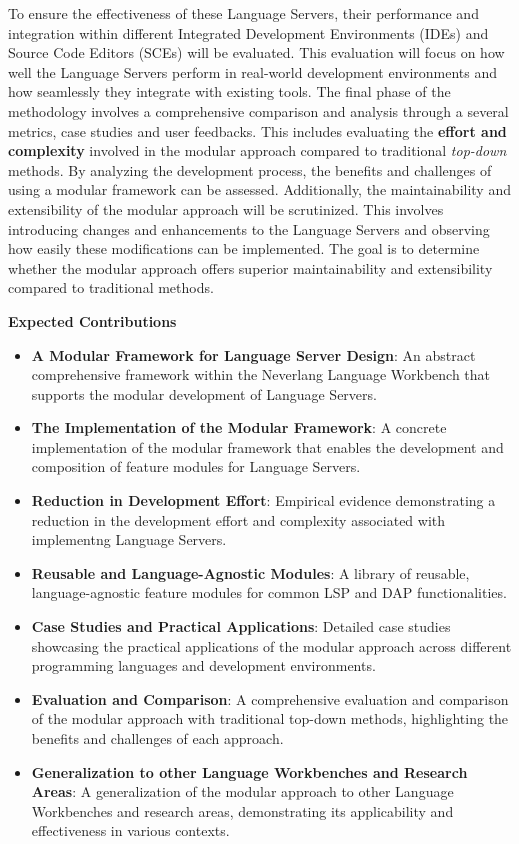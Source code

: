 To ensure the effectiveness of these Language Servers, their performance and integration within different Integrated Development Environments (IDEs) and Source Code Editors (SCEs) will be evaluated. This evaluation will focus on how well the Language Servers perform in real-world development environments and how seamlessly they integrate with existing tools. The final phase of the methodology involves a comprehensive comparison and analysis through a several metrics, case studies and user feedbacks. This includes evaluating the \textbf{effort and complexity} involved in the modular approach compared to traditional \textit{top-down} methods. By analyzing the development process, the benefits and challenges of using a modular framework can be assessed. Additionally, the maintainability and extensibility of the modular approach will be scrutinized. This involves introducing changes and enhancements to the Language Servers and observing how easily these modifications can be implemented. The goal is to determine whether the modular approach offers superior maintainability and extensibility compared to traditional methods.

\hfill \break
\noindent
\textbf{Expected Contributions}

\begin{itemize}
    \item \textbf{A Modular Framework for Language Server Design}: An abstract comprehensive framework within the Neverlang Language Workbench that supports the modular development of Language Servers.
    \item \textbf{The Implementation of the Modular Framework}: A concrete implementation of the modular framework that enables the development and composition of feature modules for Language Servers.
    \item \textbf{Reduction in Development Effort}: Empirical evidence demonstrating a reduction in the development effort and complexity associated with implementng Language Servers.
    \item \textbf{Reusable and Language-Agnostic Modules}: A library of reusable, language-agnostic feature modules for common LSP and DAP functionalities.
    \item \textbf{Case Studies and Practical Applications}: Detailed case studies showcasing the practical applications of the modular approach across different programming languages and development environments.
    \item \textbf{Evaluation and Comparison}: A comprehensive evaluation and comparison of the modular approach with traditional top-down methods, highlighting the benefits and challenges of each approach.
    \item \textbf{Generalization to other Language Workbenches and Research Areas}: A generalization of the modular approach to other Language Workbenches and research areas, demonstrating its applicability and effectiveness in various contexts.
\end{itemize}


